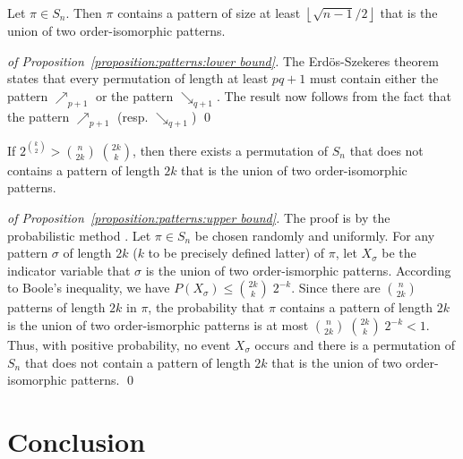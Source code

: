 \documentclass[a4paper,10pt]{llncs}
\begin{document}
\begin{proposition}
  \label{proposition:patterns:lower bound}
  Let $\pi \in S_{n}$.
  Then $\pi$ contains a pattern of size at least
  $\left\lfloor\sqrt{n-1}/2\right\rfloor$ that
  is the union of two order-isomorphic patterns.
\end{proposition}

\begin{proof}[of Proposition~\ref{proposition:patterns:lower bound}]
  The Erdös-Szekeres theorem \cite{Erdos:Szekeres:1935}
  states that every permutation of
  length at least $pq+1$ must contain either the pattern
  $\nearrow_{p+1}$ or the pattern $\searrow_{q+1}$.
  The result now follows from the fact that
  the pattern $\nearrow_{p+1}$ (resp. $\searrow_{q+1}$)
\qed
\end{proof}

\begin{proposition}
  \label{proposition:patterns:upper bound}
  If $2^{\binom{k}{2}} > \binom{n}{2k}\;\binom{2k}{k}$, then there exists
  a permutation of $S_{n}$
  that does not contains a pattern
  of length $2k$ that is the union of two
  order-isomorphic patterns.
\end{proposition}

\begin{proof}[of Proposition~\ref{proposition:patterns:upper bound}]
The proof is by the probabilistic method \cite{Alon:Spencer:1992}.
Let $\pi \in S_n$ be chosen randomly and uniformly.
For any pattern $\sigma$ of length $2k$ ($k$ to be precisely defined latter)
of $\pi$,
let $X_\sigma$ be the indicator variable that
$\sigma$ is the union of two order-ismorphic patterns.
According to Boole's inequality, we have
$P\left(X_\sigma\right) \leq \binom{2k}{k}\;2^{-k}$.
Since there are $\binom{n}{2k}$ patterns of length $2k$ in $\pi$,
the probability that $\pi$ contains a pattern of length $2k$
is the union of two order-ismorphic patterns is at most
$\binom{n}{2k}\;\binom{2k}{k}\;2^{-k} < 1$.
Thus, with positive probability, no event $X_\sigma$ occurs and
there is a permutation of $S_n$ that does not contain a pattern
of length $2k$ that is the union of two order-isomorphic patterns.
\qed
\end{proof}


\section{Conclusion}
\label{section:Conclusion}
\end{document}
